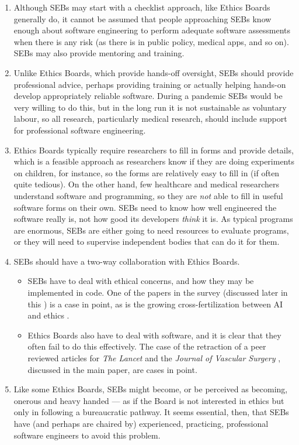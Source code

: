 \documentclass[10pt,a4paper]{article}
\begin{document}
\begin{enumerate}\raggedright
\item 
Although SEBs may start with a checklist approach, like Ethics Boards generally do, it cannot be assumed that people approaching SEBs know enough about software engineering to perform adequate software assessments when there is any risk (as there is in public policy, medical apps, and so on). SEBs may also provide mentoring and training.

\item
Unlike Ethics Boards, which provide hands-off oversight, SEBs should provide professional advice, perhaps providing training or actually helping hands-on develop appropriately reliable software. During a pandemic SEBs would be very willing to do this, but in the long run it is not sustainable as voluntary labour, so all research, particularly medical research, should include support for professional software engineering. 

\item 
Ethics Boards typically require researchers to fill in forms and provide details, which is a feasible approach as researchers know if they are doing experiments on children, for instance, so the forms are relatively easy to fill in (if often quite tedious). On the other hand, few healthcare and medical researchers understand software and programming, so they are \emph{not\/} able to fill in useful software forms on their own. SEBs need to know how well engineered the software really is, not how good its developers \emph{think\/} it is. As typical programs are enormous, SEBs are either going to need resources to evaluate programs, or they will need to supervise independent bodies that can do it for them. 

\item
SEBs should have a two-way collaboration with Ethics Boards. 

\begin{itemize}
\item SEBs have to deal with ethical concerns, and how they may be implemented in code. One of the papers \cite{ethics-paper} in the survey (discussed later in this \supplement) is a case in point, as is the growing cross-fertilization between AI and ethics .

\item Ethics Boards also have to deal with software, and it is clear that they often fail to do this effectively. The case of the retraction of a peer reviewed articles for \emph{The Lancet\/} \cite{science-lancet1,science-lancet2,lancet-learning} and the \emph{Journal of Vascular Surgery\/} \cite{jvs1,jvs2,jvs3}, discussed in the main paper, are cases in point.
\end{itemize}

\item
Like some Ethics Boards, SEBs might become, or be perceived as becoming, onerous and heavy handed --- as if the Board is not interested in ethics but only in following a bureaucratic pathway. It seems essential, then, that SEBs have (and perhaps are chaired by) experienced, practicing, professional software engineers to avoid this problem. 
\end{enumerate}
\end{document}
